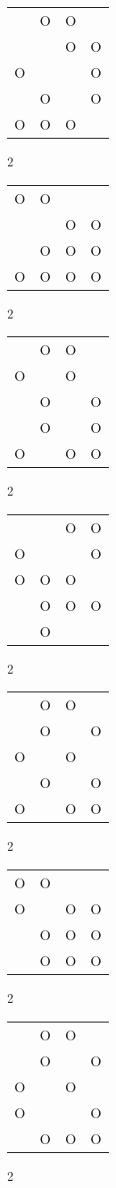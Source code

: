 \begin{tabular}{|m{0.2cm}m{0.2cm}m{0.2cm}m{0.2cm}|}\hline
 &O&O& \\
 & &O&O\\
O& & &O\\
 &O& &O\\
O&O&O& \\
\hline\end{tabular}2
\begin{tabular}{|m{0.2cm}m{0.2cm}m{0.2cm}m{0.2cm}|}\hline
O&O& & \\
 & &O&O\\
 &O&O&O\\
O&O&O&O\\
\hline\end{tabular}2
\begin{tabular}{|m{0.2cm}m{0.2cm}m{0.2cm}m{0.2cm}|}\hline
 &O&O& \\
O& &O& \\
 &O& &O\\
 &O& &O\\
O& &O&O\\
\hline\end{tabular}2
\begin{tabular}{|m{0.2cm}m{0.2cm}m{0.2cm}m{0.2cm}|}\hline
 & &O&O\\
O& & &O\\
O&O&O& \\
 &O&O&O\\
 &O& & \\
\hline\end{tabular}2
\begin{tabular}{|m{0.2cm}m{0.2cm}m{0.2cm}m{0.2cm}|}\hline
 &O&O& \\
 &O& &O\\
O& &O& \\
 &O& &O\\
O& &O&O\\
\hline\end{tabular}2
\begin{tabular}{|m{0.2cm}m{0.2cm}m{0.2cm}m{0.2cm}|}\hline
O&O& & \\
O& &O&O\\
 &O&O&O\\
 &O&O&O\\
\hline\end{tabular}2
\begin{tabular}{|m{0.2cm}m{0.2cm}m{0.2cm}m{0.2cm}|}\hline
 &O&O& \\
 &O& &O\\
O& &O& \\
O& & &O\\
 &O&O&O\\
\hline\end{tabular}2
